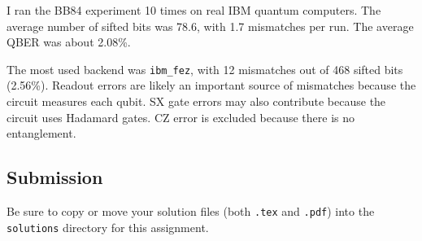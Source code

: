 \documentclass{article}
\begin{document}
\vspace{5mm}
I ran the BB84 experiment 10 times on real IBM quantum computers.
The average number of sifted bits was 78.6, with 1.7 mismatches
per run. The average QBER was about 2.08\%.

The most used backend was \texttt{ibm\_fez}, with 12 mismatches
out of 468 sifted bits (2.56\%). Readout errors are likely
an important source of mismatches because the circuit measures
each qubit. SX gate errors may also contribute because the
circuit uses Hadamard gates. CZ error is excluded because
there is no entanglement.


\vspace{5mm}


\subsection*{Submission}

Be sure to copy or move your solution files (both \texttt{.tex} and \texttt{.pdf}) into the \texttt{solutions} directory for this assignment.
\end{document}
